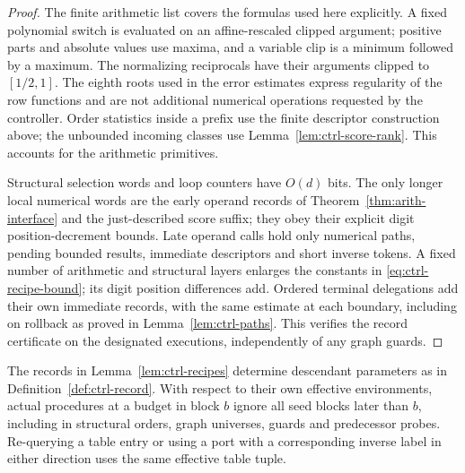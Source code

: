 \begin{proof}
The finite arithmetic list covers the formulas used here explicitly.
A fixed polynomial switch is evaluated on an affine-rescaled clipped
argument; positive parts and absolute values use maxima, and a variable
clip is a minimum followed by a maximum.  The normalizing reciprocals
have their arguments clipped to $[1/2,1]$.  The eighth roots used in the
error estimates express regularity of the row functions and are not
additional numerical operations requested by the controller.  Order statistics
inside a prefix use the finite descriptor construction above; the
unbounded incoming classes use Lemma~\ref{lem:ctrl-score-rank}.  This
accounts for the arithmetic primitives.

Structural selection words and loop counters have $O(d)$ bits.  The
only longer local numerical words are the early operand records of
Theorem~\ref{thm:arith-interface} and the just-described score suffix;
they obey their explicit digit position-decrement bounds.  Late operand calls
hold only numerical paths, pending bounded results, immediate
descriptors and short inverse tokens.  A fixed number of arithmetic and
structural layers enlarges the constants in
\eqref{eq:ctrl-recipe-bound}; its digit position differences add.  Ordered
terminal delegations add their own immediate records, with the same
estimate at each boundary, including on rollback as proved in
Lemma~\ref{lem:ctrl-paths}.  This verifies the record certificate on
the designated executions, independently of any graph guards.
\end{proof}

\begin{lemma}\label{lem:ctrl-replay}
The records in Lemma~\ref{lem:ctrl-recipes} determine descendant parameters as in Definition~\ref{def:ctrl-record}.  With respect to their own effective
environments, actual procedures at a budget in block $b$ ignore all seed
blocks later than $b$, including in structural orders, graph universes,
guards and predecessor probes.  Re-querying a
table entry or using a port with a corresponding inverse label in either direction uses the same
effective table tuple.
\end{lemma}

